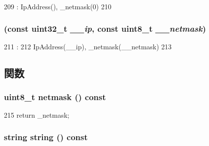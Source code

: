 \begin{DoxyCode}
209                 : IpAddress(), _netmask(0)
210     {}
\end{DoxyCode}
\hypertarget{structNet_1_1IpNetmask_ac2e215919611af0cd36f6d54848c00b7}{
\subsubsection[{IpNetmask}]{ (const {\bf uint32\_\-t} {\em \_\-\_\-ip}, \/  const uint8\_\-t {\em \_\-\_\-netmask})}}
\label{structNet_1_1IpNetmask_ac2e215919611af0cd36f6d54848c00b7}



\begin{DoxyCode}
211                                                             :
212         IpAddress(__ip), _netmask(__netmask)
213     {}

\end{DoxyCode}


\subsection{関数}
\hypertarget{structNet_1_1IpNetmask_ab76fb02ae3d0c5d13e8b01f95df60a7f}{
\subsubsection[{netmask}]{\setlength{\rightskip}{0pt plus 5cm}uint8\_\-t netmask () const}}
\label{structNet_1_1IpNetmask_ab76fb02ae3d0c5d13e8b01f95df60a7f}



\begin{DoxyCode}
215 { return _netmask; }
\end{DoxyCode}
\hypertarget{structNet_1_1IpNetmask_a14a0e4fdb44bd7be64a3c6e5d94f8f0e}{
\subsubsection[{string}]{\setlength{\rightskip}{0pt plus 5cm}string string () const}}
\label{structNet_1_1IpNetmask_a14a0e4fdb44bd7be64a3c6e5d94f8f0e}



